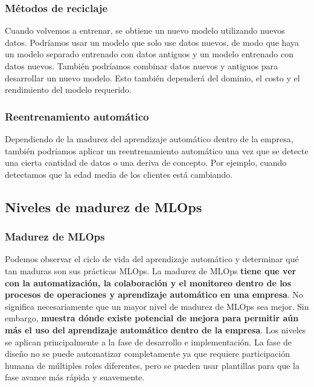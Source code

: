 \documentclass[10pt]{book}
\begin{document}
\subsubsection{Métodos de reciclaje}
Cuando volvemos a entrenar, se obtiene un nuevo modelo utilizando nuevos datos. Podríamos usar un modelo que solo use datos nuevos, de modo que haya un modelo separado entrenado con datos antiguos y un modelo entrenado con datos nuevos. También podríamos combinar datos nuevos y antiguos para desarrollar un nuevo modelo. Esto también dependerá del dominio, el costo y el rendimiento del modelo requerido.

\subsubsection{Reentrenamiento automático}
Dependiendo de la madurez del aprendizaje automático dentro de la empresa, también podríamos aplicar un reentrenamiento automático una vez que se detecte una cierta cantidad de datos o una deriva de concepto. Por ejemplo, cuando detectamos que la edad media de los clientes está cambiando.


\subsection{Niveles de madurez de MLOps}

\subsubsection{Madurez de MLOps}
Podemos observar el ciclo de vida del aprendizaje automático y determinar qué tan maduras son sus prácticas MLOps. La madurez de MLOps \textbf{tiene que ver con la automatización, la colaboración y el monitoreo dentro de los procesos de operaciones y aprendizaje automático en una empresa}. No significa necesariamente que un mayor nivel de madurez de MLOps sea mejor. Sin embargo, \textbf{muestra dónde existe potencial de mejora para permitir aún más el uso del aprendizaje automático dentro de la empresa}. Los niveles se aplican principalmente a la fase de desarrollo e implementación. La fase de diseño no se puede automatizar completamente ya que requiere participación humana de múltiples roles diferentes, pero se pueden usar plantillas para que la fase avance más rápida y suavemente.
\end{document}
